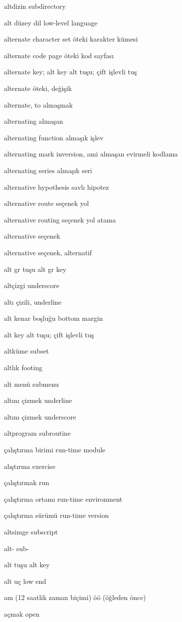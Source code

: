 \documentclass[12pt,fleqn]{article}\usepackage{../../common}
\begin{document}
altdizin subdirectory

alt düzey dil low-level language

alternate character set öteki karakter kümesi

alternate code page öteki kod sayfası

alternate key; alt key alt tuşu; çift işlevli tuş

alternate öteki, değişik

alternate, to almaşmak

alternating almaşan

alternating function almaşık işlev

alternating mark inversion, ami almaşan evirmeli kodlama

alternating series almaşık seri

alternative hypothesis savlı hipotez

alternative route seçenek yol

alternative routing seçenek yol atama

alternative seçenek

alternative seçenek, alternatif

alt gr tuşu alt gr key

altçizgi underscore

altı çizili, underline

alt kenar boşluğu bottom margin

alt key alt tuşu; çift işlevli tuş

altküme subset

altlık footing

alt menü submenu

altını çizmek underline

altını çizmek underscore

altprogram subroutine

çalıştırma birimi run-time module

alıştırma exercise

çalıştırmak run

çalıştırma ortamı run-time environment

çalıştırma sürümü run-time version

altsimge subscript

alt- sub-

alt tuşu alt key

alt uç low end

am (12 saatlik zaman biçimi) öö (öğleden önce)

açmak open
\end{document}
